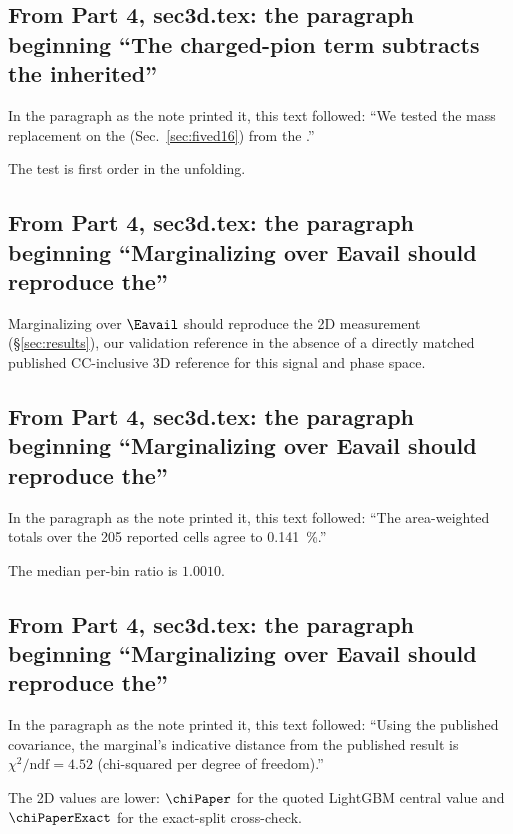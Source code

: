 \subsection{From Part 4, sec3d.tex: the paragraph beginning ``The charged-pion term subtracts the inherited''}
In the paragraph as the note printed it, this text followed: ``We tested the mass replacement on the \resSixteen{} (Sec.~\ref{sec:fived16}) from the \estMultiD{}.''\par
The test is first order in the unfolding.

\subsection{From Part 4, sec3d.tex: the paragraph beginning ``Marginalizing over Eavail should reproduce the''}
Marginalizing over $\Eavail$ should reproduce the 2D measurement (\S\ref{sec:results}), our validation reference in the absence of a directly matched published CC-inclusive 3D reference for this signal and phase space.

\subsection{From Part 4, sec3d.tex: the paragraph beginning ``Marginalizing over Eavail should reproduce the''}
In the paragraph as the note printed it, this text followed: ``The area-weighted totals over the 205 reported cells agree to \SI{0.141}{\percent}.''\par
The median per-bin ratio is $1.0010$.

\subsection{From Part 4, sec3d.tex: the paragraph beginning ``Marginalizing over Eavail should reproduce the''}
In the paragraph as the note printed it, this text followed: ``Using the published covariance, the marginal's indicative distance from the published result is $\chi^{2}/\mathrm{ndf}=4.52$ (chi-squared per degree of freedom).''\par
The 2D values are lower: $\chiPaper$ for the quoted LightGBM central value and $\chiPaperExact$ for the exact-split cross-check.

